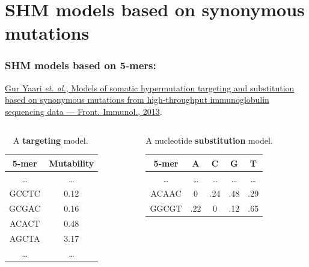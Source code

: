 \documentclass{beamer}\usepackage[]{graphicx}\usepackage[]{color}
\begin{document}
\section{SHM models based on synonymous mutations}
\begin{frame}
    \frametitle{SHM models based on 5-mers:}
    \href{http://journal.frontiersin.org/article/10.3389/fimmu.2013.00358/abstract}{Gur Yaari \textit{et. al.},
        Models of somatic hypermutation targeting and substitution based on synonymous mutations
        from high-throughput immunoglobulin sequencing data --- Front. Immunol., 2013}.
    \pause
    \bigskip
    \begin{columns}[c]
        \begin{column}{0.4\textwidth}
            \ \, \quad A \textbf{targeting}
            model.
            \begin{table}[]
                \centering
                \begin{tabular}{c|c}
                5-mer & Mutability \\ \hline
                    \ldots & \ldots \\
                    GC{\color{red}C}TC & 0.12       \\
                    GC{\color{red}G}AC & 0.16       \\
                    AC{\color{red}A}CT & 0.48       \\
                    AG{\color{red}C}TA & 3.17       \\
                    \ldots & \ldots
                \end{tabular}
            \end{table}
        \end{column}
        \pause
        \begin{column}{0.6\textwidth}
            \qquad A nucleotide \textbf{substitution} model.
            \begin{table}[]
                \centering
                \begin{tabular}{c|c|c|c|c}
                    5-mer & \multicolumn{1}{c|}{A} & \multicolumn{1}{c|}{C} & \multicolumn{1}{c|}{G} & T   \\ \hline
                    \ldots & \ldots & \ldots & \ldots  & \ldots \\
                    AC{\color{red}A}AC   & 0                      & .24                    & .48                    & .29 \\
                    GG{\color{red}C}GT   & .22                    & 0                      & .12                    & .65 \\

\end{tabular}
\end{table}
\end{column}
\end{columns}
\end{frame}
\end{document}
